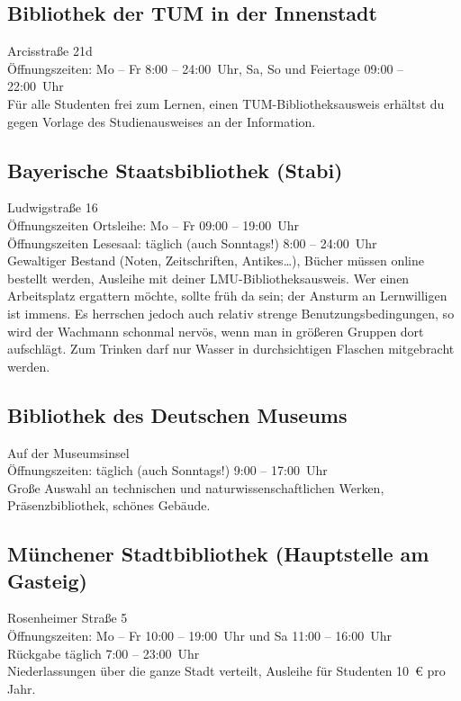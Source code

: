 \subsection*{Bibliothek der TUM in der Innenstadt}
Arcisstraße 21d\\
Öffnungszeiten: Mo -- Fr 8:00 -- 24:00~Uhr, Sa, So und Feiertage 09:00 -- 22:00~Uhr\\
Für alle Studenten frei zum Lernen, einen TUM-Bibliotheksausweis erhältst du gegen Vorlage des Studienausweises an der Information.

\begin{urlList}
\end{urlList}

\subsection*{Bayerische Staatsbibliothek (Stabi)}
Ludwigstraße 16\\
Öffnungszeiten Ortsleihe: Mo -- Fr 09:00 -- 19:00~Uhr\\
Öffnungszeiten Lesesaal: täglich (auch Sonntags!) 8:00 -- 24:00~Uhr\\
Gewaltiger Bestand (Noten, Zeitschriften, Antikes\ldots), Bücher
müssen online bestellt werden, Ausleihe mit deiner LMU-Bibliotheksausweis. Wer
einen Arbeitsplatz ergattern möchte, sollte früh da sein; der
Ansturm an Lernwilligen ist immens.
Es herrschen jedoch auch relativ strenge Benutzungsbedingungen, so wird der Wachmann schonmal nervös, wenn man in größeren Gruppen dort aufschlägt.
Zum Trinken darf nur Wasser in durchsichtigen Flaschen mitgebracht werden.

\begin{urlList}
\end{urlList}

\subsection*{Bibliothek des Deutschen Museums}
Auf der Museumsinsel\\
Öffnungszeiten: täglich (auch Sonntags!) 9:00 -- 17:00~Uhr\\
Große Auswahl an technischen und naturwissenschaftlichen Werken, Präsenzbibliothek, schönes Gebäude.

\begin{urlList}
\end{urlList}

\subsection*{Münchener Stadtbibliothek (Hauptstelle am Gasteig)}
Rosenheimer Straße 5\\
Öffnungszeiten: Mo -- Fr 10:00 -- 19:00~Uhr und Sa 11:00 -- 16:00~Uhr\\
Rückgabe täglich 7:00 -- 23:00~Uhr\\
Niederlassungen über die ganze Stadt verteilt, Ausleihe für Studenten 10~€ pro Jahr.

\begin{urlList}
\end{urlList}
